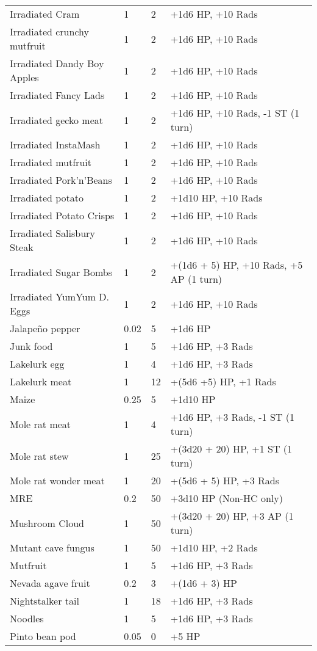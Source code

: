 \begin{longtable}{|p{4cm}|p{1.5cm}|p{1.5cm}|p{9cm}|}
Irradiated Cram & 1 & 2 & +1d6 HP, +10 Rads \\
Irradiated crunchy mutfruit & 1 & 2 & +1d6 HP, +10 Rads \\
Irradiated Dandy Boy Apples & 1 & 2 & +1d6 HP, +10 Rads \\
Irradiated Fancy Lads & 1 & 2 & +1d6 HP, +10 Rads \\
Irradiated gecko meat & 1 & 2 & +1d6 HP, +10 Rads, -1 ST (1 turn) \\
Irradiated InstaMash & 1 & 2 & +1d6 HP, +10 Rads \\
Irradiated mutfruit & 1 & 2 & +1d6 HP, +10 Rads \\
Irradiated Pork'n'Beans & 1 & 2 & +1d6 HP, +10 Rads \\
Irradiated potato & 1 & 2 & +1d10 HP, +10 Rads \\
Irradiated Potato Crisps & 1 & 2 & +1d6 HP, +10 Rads \\
Irradiated Salisbury Steak & 1 & 2 & +1d6 HP, +10 Rads \\
Irradiated Sugar Bombs & 1 & 2 & +(1d6 + 5) HP, +10 Rads, +5 AP (1 turn) \\
Irradiated YumYum D. Eggs & 1 & 2 & +1d6 HP, +10 Rads \\
Jalapeño pepper & 0.02 & 5 & +1d6 HP \\
Junk food & 1 & 5 & +1d6 HP, +3 Rads \\
Lakelurk egg & 1 & 4 & +1d6 HP, +3 Rads \\
Lakelurk meat & 1 & 12 & +(5d6 +5) HP, +1 Rads \\
Maize & 0.25 & 5 & +1d10 HP \\
Mole rat meat & 1 & 4 & +1d6 HP, +3 Rads, -1 ST (1 turn) \\
Mole rat stew & 1 & 25 & +(3d20 + 20) HP, +1 ST (1 turn) \\
Mole rat wonder meat & 1 & 20 & +(5d6 + 5) HP, +3 Rads \\
MRE & 0.2 & 50 & +3d10 HP (Non-HC only) \\
Mushroom Cloud & 1 & 50 & +(3d20 + 20) HP, +3 AP (1 turn) \\
Mutant cave fungus & 1 & 50 & +1d10 HP, +2 Rads \\
Mutfruit & 1 & 5 & +1d6 HP, +3 Rads \\
Nevada agave fruit & 0.2 & 3 & +(1d6 + 3) HP \\
Nightstalker tail & 1 & 18 & +1d6 HP, +3 Rads \\
Noodles & 1 & 5 & +1d6 HP, +3 Rads \\
Pinto bean pod & 0.05 & 0 & +5 HP \\

\end{longtable}
